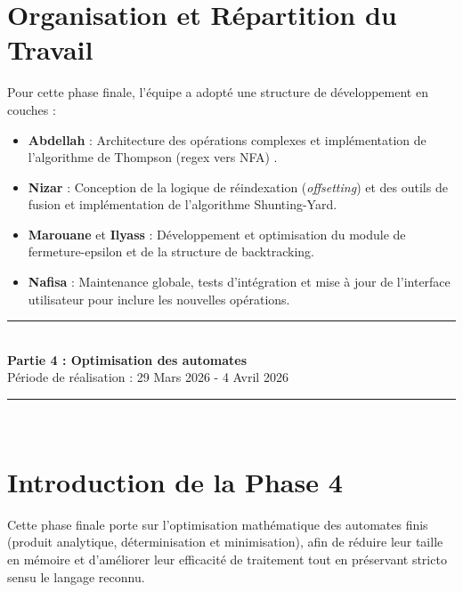 \documentclass[12pt,a4paper]{article}
\newcommand{\HRule}{\rule{\linewidth}{0.5mm}}
\begin{document}
\section{Organisation et Répartition du Travail}
Pour cette phase finale, l'équipe a adopté une structure de développement en couches :
\begin{itemize}
    \item \textbf{Abdellah} : Architecture des opérations complexes et implémentation de l'algorithme de Thompson (regex vers NFA) .
    \item \textbf{Nizar} : Conception de la logique de réindexation (\textit{offsetting}) et des outils de fusion  et implémentation de l'algorithme Shunting-Yard.
    \item \textbf{Marouane} et \textbf{Ilyass} : Développement et optimisation du module de fermeture-epsilon et de la structure de backtracking.
    \item \textbf{Nafisa} : Maintenance globale, tests d'intégration et mise à jour de l'interface utilisateur pour inclure les nouvelles opérations.
\end{itemize}

\newpage
\begin{center}
\vspace*{1cm}
\HRule \\[0.5cm]
\textbf{\huge Partie 4 : Optimisation des automates} \\[0.5cm]
\Large Période de réalisation : 29 Mars 2026 - 4 Avril 2026 \\
\HRule \\
\vspace*{1cm}
\end{center}

\section{Introduction de la Phase 4}
Cette phase finale porte sur l'optimisation mathématique des automates finis (produit analytique, déterminisation et minimisation), afin de réduire leur taille en mémoire et d'améliorer leur efficacité de traitement tout en préservant stricto sensu le langage reconnu. 
\end{document}
